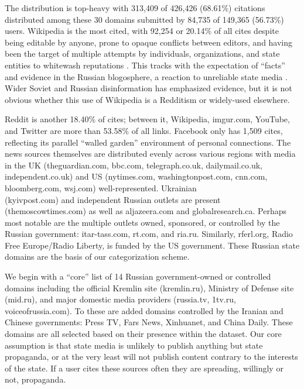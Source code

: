 The distribution is top-heavy with 313,409 of 426,426 (68.61\%) citations distributed among these 30 domains submitted by 84,735 of 149,365 (56.73\%) users.
Wikipedia is the most cited, with 92,254 or 20.14\% of all cites despite being editable by anyone, prone to opaque conflicts between editors, and having been the target of multiple attempts by individuals, organizations, and state entities to whitewash reputations \cite{wiki:criticism}.
This tracks with the expectation of ``facts'' and evidence in the Russian blogosphere, a reaction to unreliable state media \cite[p. 25]{woolley2018}.
Wider Soviet and Russian disinformation has emphasized evidence, but it is not obvious whether this use of Wikipedia is a Redditism or widely-used elsewhere.

Reddit is another 18.40\% of cites; between it, Wikipedia, imgur.com, YouTube, and Twitter are more than 53.58\% of all links.
Facebook only has 1,509 cites, reflecting its parallel ``walled garden'' environment of personal connections.
The news sources themselves are distributed evenly across various regions with media in the UK (theguardian.com, bbc.com, telegraph.co.uk, dailymail.co.uk, independent.co.uk) and US (nytimes.com, washingtonpost.com, cnn.com, bloomberg.com, wsj.com) well-represented.
Ukrainian \\ (kyivpost.com) and independent Russian outlets are present (themoscowtimes.com) as well as aljazeera.com and globalresearch.ca.
Perhaps most notable are the multiple outlets owned, sponsored, or controlled by the Russian government: itar-tass.com, rt.com, and ria.ru.
Similarly, rferl.org, Radio Free Europe/Radio Liberty, is funded by the US government.
These Russian state domains are the basis of our categorization scheme.

We begin with a ``core'' list of 14 Russian government-owned or controlled domains including the official Kremlin site (kremlin.ru), Ministry of Defense site (mid.ru), and major domestic media providers (russia.tv, 1tv.ru, voiceofrussia.com).
To these are added domains controlled by the Iranian and Chinese governments: Press TV, Fars News, Xinhuanet, and China Daily.
These domains are all selected based on their presence within the dataset.
Our core assumption is that state media is unlikely to publish anything but state propaganda, or at the very least will not publish content contrary to the interests of the state.
If a user cites these sources often they are spreading, willingly or not, propaganda.

